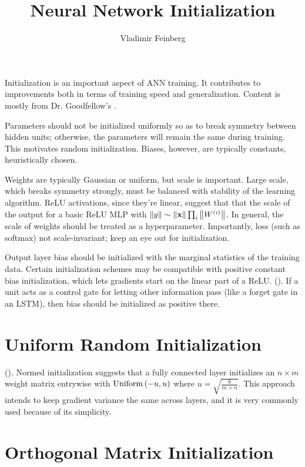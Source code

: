 \documentclass{article}
\title{Neural Network Initialization}
\author{Vladimir Feinberg}
\begin{document}
\maketitle

Initialization is an important aspect of ANN training. It contributes to improvements both in terms of training speed and generalization. Content is mostly from Dr. Goodfellow's .

Parameters should not be initialized uniformly so as to break symmetry between hidden units; otherwise, the parameters will remain the same during training. This motivates random initialization. Biases, however, are typically constants, heuristically chosen.

Weights are typically Gaussian or uniform, but scale is important. Large scale, which breaks symmetry strongly, must be balanced with stability of the learning algorithm. ReLU activations, since they're linear, suggest that that the scale of the output for a basic ReLU MLP with $\left\| y \right\|\sim \left\| \textbf{x} \right\|\prod_i\left\| W^{(i)} \right\|$. In general, the scale of weights should be treated as a hyperparameter. Importantly, loss (such as softmax) not scale-invariant; keep an eye out for initialization.

Output layer bias should be initialized with the marginal statistics of the training data. Certain initialization schemes may be compatible with positive constant bias initialization, which lets gradients start on the linear part of a ReLU. (). If a unit acts as a control gate for letting other information pass (like a forget gate in an LSTM), then bias should be initialized as positive there.

\section{Uniform Random Initialization}

(). Normed initialization suggests that a fully connected layer initializes an $n\times m$ weight matrix entrywise with $\operatorname{Uniform}\left({-u, u}\right)$ where $u=\sqrt{\frac{6}{m+n}}$. This approach intends to keep gradient variance the same across layers, and it is very commonly used because of its simplicity.

\section{Orthogonal Matrix Initialization}
\end{document}
